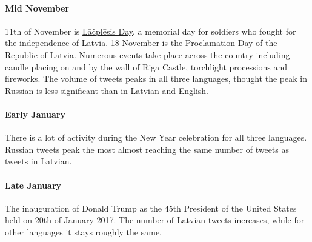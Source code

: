 \documentclass[11pt,a4paper]{article}
\begin{document}
\paragraph{Mid November}

11th of November is \href{https://en.wikipedia.org/wiki/L\%C4\%81\%C4\%8Dpl\%C4\%93sis_Day}{L\={a}\v{c}pl\={e}sis Day}, a memorial day for soldiers who fought for the independence of Latvia. 18 November is the Proclamation Day of the Republic of Latvia. Numerous events take place across the country including candle placing on and by the wall of Riga Castle, torchlight processions and fireworks. The volume of tweets peaks in all three languages, thought the peak in Russian is less significant than in Latvian and English.



\paragraph{Early January}

There is a lot of activity during the New Year celebration for all three languages. Russian tweets peak the most almost reaching the same number of tweets as tweets in Latvian.

\paragraph{Late January}

The inauguration of Donald Trump as the 45th President of the United States held on 20th of January 2017. The number of Latvian tweets increases, while for other languages it stays roughly the same.



\end{document}
